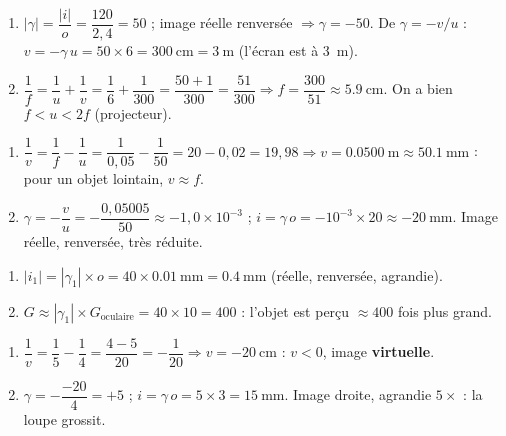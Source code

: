 \documentclass[11pt,a4paper]{article}
\begin{document}

\begin{corrige}
\begin{enumerate}[label=\alph*)]
  \item $|\gamma|=\dfrac{|i|}{o}=\dfrac{120}{2,4}=50$ ; image réelle renversée $\Rightarrow \gamma=-50$.
        De $\gamma=-v/u$ : $v=-\gamma\,u=50\times 6=\qty{300}{\cm}=\qty{3}{\m}$ (l'écran est à \qty{3}{\m}).
  \item $\dfrac{1}{f}=\dfrac{1}{u}+\dfrac{1}{v}=\dfrac{1}{6}+\dfrac{1}{300}=\dfrac{50+1}{300}=\dfrac{51}{300}
        \Rightarrow f=\dfrac{300}{51}\approx\qty{5.9}{\cm}$. On a bien $f<u<2f$ (projecteur).
\end{enumerate}
\end{corrige}

\begin{corrige}
\begin{enumerate}[label=\alph*)]
  \item $\dfrac{1}{v}=\dfrac{1}{f}-\dfrac{1}{u}=\dfrac{1}{0,05}-\dfrac{1}{50}=20-0{,}02=19{,}98
        \Rightarrow v=\qty{0.0500}{\m}\approx\qty{50.1}{\mm}$ : pour un objet lointain, $v\approx f$.
  \item $\gamma=-\dfrac{v}{u}=-\dfrac{0,05005}{50}\approx-1{,}0\times10^{-3}$ ;
        $i=\gamma\,o=-10^{-3}\times 20\approx\qty{-20}{\mm}$. Image réelle, renversée, très réduite.
\end{enumerate}
\end{corrige}

\begin{corrige}
\begin{enumerate}[label=\alph*)]
  \item $|i_1|=|\gamma_1|\times o=40\times\qty{0.01}{\mm}=\qty{0.4}{\mm}$ (réelle, renversée, agrandie).
  \item $G\approx|\gamma_1|\times G_{\text{oculaire}}=40\times 10=400$ : l'objet est perçu $\approx 400$
        fois plus grand.
\end{enumerate}
\end{corrige}

\begin{corrige}
\begin{enumerate}[label=\alph*)]
  \item $\dfrac{1}{v}=\dfrac{1}{5}-\dfrac{1}{4}=\dfrac{4-5}{20}=-\dfrac{1}{20}\Rightarrow v=-\qty{20}{\cm}$ :
        $v<0$, image \textbf{virtuelle}.
  \item $\gamma=-\dfrac{-20}{4}=+5$ ; $i=\gamma\,o=5\times 3=\qty{15}{\mm}$. Image droite, agrandie
        $5\times$ : la loupe grossit.
\end{enumerate}
\end{corrige}
\end{document}
